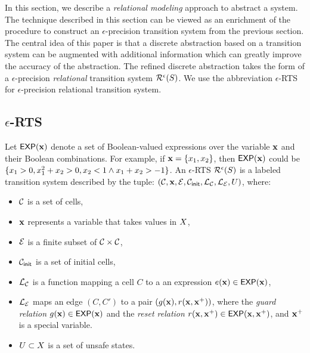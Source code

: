 In this section, we describe a {\em relational modeling} approach to
abstract a system. The technique described in this section can be
viewed as an enrichment of the procedure to construct an
$\epsilon$-precision transition system from the previous section.  The
central idea of this paper is that a discrete abstraction based on a
transition system can be augmented with additional information which
can greatly improve the accuracy of the abstraction. The refined
discrete abstraction takes the form of a $\epsilon$-precision {\em
relational} transition system $\mathcal{R}^{\epsilon}(S)$. We
use the abbreviation $\epsilon$-RTS for $\epsilon$-precision
relational transition system.

\subsection{$\epsilon$-RTS}
Let $\mathsf{EXP}(\mathbf{x})$ denote a set of Boolean-valued expressions over the
variable $\mathbf{x}$ and their Boolean combinations.  For example, if $\mathbf{x} =
\{x_1,x_2\}$, then $\mathsf{EXP}(\mathbf{x})$ could be $\{ x_1 > 0, x^2_1
+ x_2 > 0, x_2 < 1 \wedge x_1 + x_2 > -1\}$.  An $\epsilon$-RTS
$\mathcal{R}^{\epsilon}(S)$ is a labeled transition system
described by the tuple:
$(\mathcal{C},\mathbf{x},\mathcal{E},\mathcal{C}_{\mathsf{init}},\mathcal{L}_\mathcal{C},
\mathcal{L}_\mathcal{E},U)$, where:

\begin{itemize}[label=--,leftmargin=1em,labelsep=*]
\item
$\mathcal{C}$ is a set of cells,
\item
$\mathbf{x}$ represents a variable that takes values in $X$,
\item
$\mathcal{E}$ is a finite subset of $\mathcal{C} \times \mathcal{C}$,
\item
$\mathcal{C}_{\mathsf{init}}$ is a set of initial cells,
\item
$\mathcal{L}_\mathcal{C}$ is a function mapping a cell $C$ to a
an expression $e(\mathbf{x}) \in \mathsf{EXP}(\mathbf{x})$,
\item
$\mathcal{L}_\mathcal{E}$ maps an edge $(C,C')$ to a pair $(g(\mathbf{x}),
r(\mathbf{x},\mathbf{x}^{+}))$, where the {\em guard relation} $g(\mathbf{x}) \in \mathsf{EXP}(\mathbf{x})$
and the {\em reset relation} $r(\mathbf{x},\mathbf{x}^{+}) \in \mathsf{EXP}(\mathbf{x},\mathbf{x}^{+})$, and
$\mathbf{x}^{+}$ is a special variable.
\item
$U \subset X$ is a set of unsafe states.
\end{itemize}


